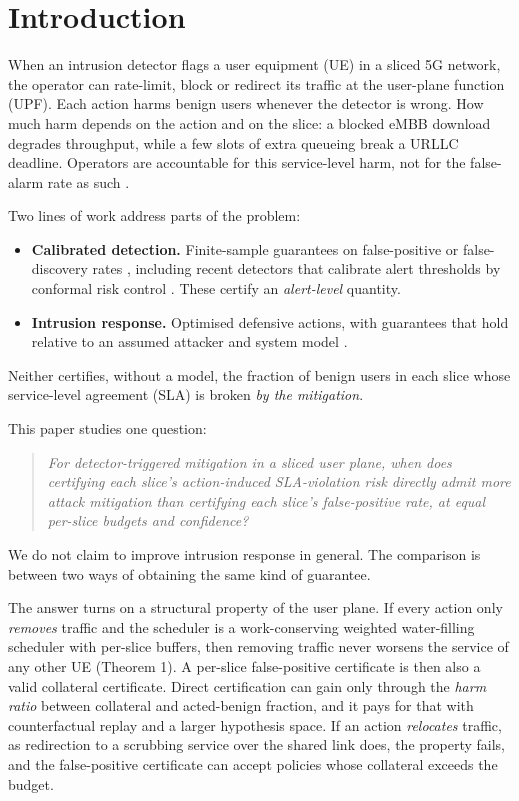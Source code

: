 \hypertarget{sec:intro}{%
\section{Introduction}\label{sec:intro}}

When an intrusion detector flags a user equipment (UE) in a sliced 5G
network, the operator can rate-limit, block or redirect its traffic at
the user-plane function (UPF). Each action harms benign users whenever
the detector is wrong. How much harm depends on the action and on the
slice: a blocked eMBB download degrades throughput, while a few slots of
extra queueing break a URLLC deadline. Operators are accountable for
this service-level harm, not for the false-alarm rate as such
\cite{sommer2010outside, arp2022dos}.

Two lines of work address parts of the problem:

\begin{itemize}
\tightlist
\item
  \textbf{Calibrated detection.} Finite-sample guarantees on
  false-positive or false-discovery rates \cite{bates2023outliers},
  including recent detectors that calibrate alert thresholds by
  conformal risk control
  \cite{youssef2026caliburn, barrett2026firce, farzaneh2025ccoad}.
  These certify an \emph{alert-level} quantity.
\item
  \textbf{Intrusion response.} Optimised defensive actions, with
  guarantees that hold relative to an assumed attacker and system model
  \cite{hammar2022optimalstopping, hammar2024dynamic, zonouz2014rre}.
\end{itemize}

Neither certifies, without a model, the fraction of benign users in each
slice whose service-level agreement (SLA) is broken \emph{by the
mitigation}.

This paper studies one question:

\begin{quote}
\emph{For detector-triggered mitigation in a sliced user plane, when
does certifying each slice's action-induced SLA-violation risk directly
admit more attack mitigation than certifying each slice's false-positive
rate, at equal per-slice budgets and confidence?}
\end{quote}

We do not claim to improve intrusion response in general. The comparison
is between two ways of obtaining the same kind of guarantee.

The answer turns on a structural property of the user plane. If every
action only \emph{removes} traffic and the scheduler is a
work-conserving weighted water-filling scheduler with per-slice buffers,
then removing traffic never worsens the service of any other UE (Theorem
1). A per-slice false-positive certificate is then also a valid
collateral certificate. Direct certification can gain only through the
\emph{harm ratio} between collateral and acted-benign fraction, and it
pays for that with counterfactual replay and a larger hypothesis space.
If an action \emph{relocates} traffic, as redirection to a scrubbing
service over the shared link does, the property fails, and the
false-positive certificate can accept policies whose collateral exceeds
the budget.

